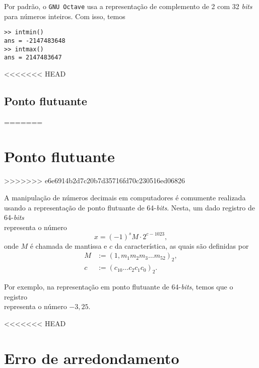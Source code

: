 \ifisoctave
\begin{obs}
  Por padrão, o \verb+GNU Octave+ usa a representação de complemento de 2 com 32 {\it bits} para números inteiros. Com isso, temos
\begin{verbatim}
>> intmin()
ans = -2147483648
>> intmax()
ans = 2147483647
\end{verbatim}
\end{obs}
\fi

<<<<<<< HEAD
\subsection{Ponto flutuante}
=======
\section{Ponto flutuante}\label{cap_aritm_sec_ptoflutuante}
>>>>>>> e6e6914b2d7c20b7d35716fd70c230516ed06826

A manipulação de números decimais em computadores é comumente realizada usando a representação de ponto flutuante de 64-{\it bits}. Nesta, um dado registro de 64-{\it bits}
\begin{equation}
  [m_{52} ~ m_{51} ~ m_{50} ~ \cdots ~ m_{1} ~ | ~ c_0 ~ c_1 ~ c_2 ~ \cdots ~ c_{10} ~ | ~ s]
\end{equation}
representa o número
\begin{equation}
  x = (-1)^s M\cdot 2^{c - 1023},
\end{equation}
onde $M$ é chamada de mantissa e $c$ da característica, as quais são definidas por
\begin{align}
  M &:= (1,m_1m_2m_3\ldots m_{52})_2,\\
  c &:= (c_{10}\ldots c_2c_1c_0)_2.
\end{align}

\begin{ex}
  Por exemplo, na representação em ponto flutuante de 64-{\it bits}, temos que o registro
  \begin{equation}
    [0 ~ 0 ~ 0 ~ \cdots ~ 0 ~ 1 ~ 0 ~ 1 ~ | ~ 0 ~ 0 ~ 0 ~ \cdots ~ 0 ~ 1 ~ | ~ 1]
  \end{equation}
representa o número $-3,25$.
\end{ex}

<<<<<<< HEAD
\section{Erro de arredondamento}

